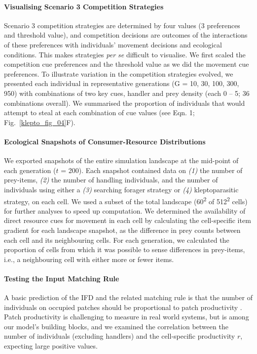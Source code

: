 \paragraph{Visualising Scenario 3 Competition Strategies}

Scenario 3 competition strategies are determined by four values (3 preferences and threshold value), and competition decisions are outcomes of the interactions of these preferences with individuals' movement decisions and ecological conditions.
This makes strategies \textit{per se} difficult to visualise.
We first scaled the competition cue preferences and the threshold value as we did the movement cue preferences.
To illustrate variation in the competition strategies evolved, we presented each individual in representative generations (G = 10, 30, 100, 300, 950) with combinations of two key cues, handler and prey density (each 0 -- 5; 36 combinations overall).
We summarised the proportion of individuals that would attempt to steal at each combination of cue values (see Eqn. 1; Fig.~\ref{klepto_fig_04}F).

\paragraph{Ecological Snapshots of Consumer-Resource Distributions}

We exported snapshots of the entire simulation landscape at the mid-point of each generation ($t$ = 200).
Each snapshot contained data on \textit{(1)} the number of prey-items, \textit{(2)} the number of handling individuals, and the number of individuals using either a \textit{(3)} searching forager strategy or \textit{(4)} kleptoparasitic strategy, on each cell.
We used a subset of the total landscape (60\textsuperscript{2} of 512\textsuperscript{2} cells) for further analyses to speed up computation.
We determined the availability of direct resource cues for movement in each cell by calculating the cell-specific item gradient for each landscape snapshot, as the difference in prey counts between each cell and its neighbouring cells.
For each generation, we calculated the proportion of cells from which it was possible to sense differences in prey-items, i.e., a neighbouring cell with either more or fewer items.

\paragraph{Testing the Input Matching Rule}

A basic prediction of the IFD and the related matching rule is that the number of individuals on occupied patches should be proportional to patch productivity \citep{fretwell1970,parker1978,houston2008}.
Patch productivity is challenging to measure in real world systems, but is among our model's building blocks, and we examined the correlation between the number of individuals (excluding handlers) and the cell-specific productivity $r$, expecting large positive values.

